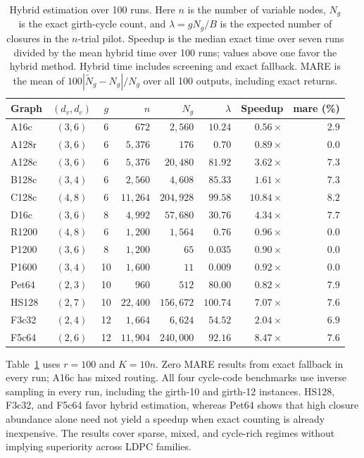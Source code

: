 \begin{table}[!ht]
\centering
\caption{Hybrid estimation over 100 runs.
Here $n$ is the number of variable nodes, $N_g$ is the exact girth-cycle
count, and $\lambda=gN_g/B$ is the expected number of closures in the
$n$-trial pilot.
Speedup is the median exact time over seven runs divided by the mean
hybrid time over 100 runs; values above one favor the hybrid method.
Hybrid time includes screening and exact fallback.
MARE is the mean of $100|\widetilde N_g-N_g|/N_g$ over all 100 outputs,
including exact returns.}
\label{tab:hybrid-exp}
\footnotesize
\setlength{\tabcolsep}{3.6pt}
\begin{tabular}{lccrrrrr}
\hline
Graph & $(d_v,d_c)$ & $g$ & $n$ & $N_g$ & $\lambda$
& Speedup & mare (\%)\\
\hline
A16c & $(3,6)$ & 6 & $672$ & $2,560$ & $10.24$ & $0.56\times$ & $2.9$\\
A128r & $(3,6)$ & 6 & $5,376$ & $176$ & $0.70$ & $0.89\times$ & $0.0$\\
A128c & $(3,6)$ & 6 & $5,376$ & $20,480$ & $81.92$ & $3.62\times$ & $7.3$\\
B128c & $(3,4)$ & 6 & $2,560$ & $4,608$ & $85.33$ & $1.61\times$ & $7.3$\\
C128c & $(4,8)$ & 6 & $11,264$ & $204,928$ & $99.58$ & $10.84\times$ & $8.2$\\
D16c & $(3,6)$ & 8 & $4,992$ & $57,680$ & $30.76$ & $4.34\times$ & $7.7$\\
R1200 & $(4,8)$ & 6 & $1,200$ & $1,564$ & $0.76$ & $0.96\times$ & $0.0$\\
P1200 & $(3,6)$ & 8 & $1,200$ & $65$ & $0.035$ & $0.90\times$ & $0.0$\\
P1600 & $(3,4)$ & 10 & $1,600$ & $11$ & $0.009$ & $0.92\times$ & $0.0$\\
Pet64 & $(2,3)$ & 10 & $960$ & $512$ & $80.00$ & $0.82\times$ & $7.9$\\
HS128 & $(2,7)$ & 10 & $22,400$ & $156,672$ & $100.74$ & $7.07\times$ & $7.6$\\
F3c32 & $(2,4)$ & 12 & $1,664$ & $6,624$ & $54.52$ & $2.04\times$ & $6.9$\\
F5c64 & $(2,6)$ & 12 & $11,904$ & $240,000$ & $92.16$ & $8.47\times$ & $7.6$\\
\hline
\end{tabular}
\end{table}

Table~\ref{tab:hybrid-exp} uses $r=100$ and $K=10n$.
Zero MARE results from exact fallback in every run; A16c has mixed routing.
All four cycle-code benchmarks use inverse sampling in every run,
including the girth-10 and girth-12 instances.
HS128, F3c32, and F5c64 favor hybrid estimation, whereas Pet64 shows
that high closure abundance alone need not yield a speedup when exact
counting is already inexpensive. The results cover sparse, mixed,
and cycle-rich regimes without implying superiority across LDPC families.

